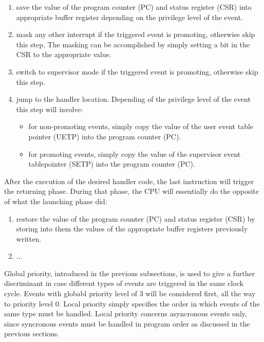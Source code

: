 \documentclass{article}
\begin{document}
            \begin{enumerate}

                \item save the value of the program counter (PC) and status register (CSR) into appropriate buffer register depending on the privilege level of the event.
                \item mask any other interrupt if the triggered event is promoting, otherwise skip this step. The masking can be accomplished by simply setting a bit in the CSR to the appropriate value.
                \item switch to supervisor mode if the triggered event is promoting, otherwise skip this step.
                \item jump to the handler location. Depending of the privilege level of the event this step will involve:

                    \begin{itemize}

                        \item for non-promoting events, simply copy the value of the user event table pointer (UETP) into the program counter (PC).
                        \item for promoting events, simply copy the value of the supervisor event tablepointer (SETP) into the program counter (PC).

                    \end{itemize}

            \end{enumerate}

            After the execution of the desired handler code, the last instruction will trigger the returning phase. During that phase, the CPU will essentially do the opposite of what the launching phase did:

            \begin{enumerate}

                \item restore the value of the program counter (PC) and status register (CSR) by storing into them the values of the appropriate buffer registers previously written.
                \item ...

            \end{enumerate}

            Global priority, introduced in the previous subsections, is used to give a further discriminant in case different types of events are triggered in the same clock cycle. Events with globabl priority level of 3 will be considered first, all the way to priority level 0. Local priority simply specifies the order in which events of the same type must be handled. Local priority concerns asyncronous events only, since syncronous events must be handled in program order as discussed in the previous sections.
\end{document}
